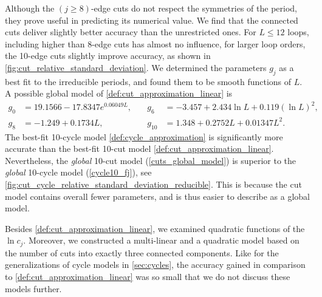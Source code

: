 \documentclass[12pt]{article}
\numberwithin{equation}{section}
\begin{document}
Although the $(j\geq 8)$-edge cuts do not respect the symmetries of the period, they prove useful in predicting its numerical value. We find that the connected cuts deliver slightly better accuracy than the unrestricted ones. For $L \leq 12$ loops,  including higher than $8$-edge cuts has almost no influence, for larger loop orders, the 10-edge cuts slightly improve accuracy, as shown in \cref{fig:cut_relative_standard_deviation}.  
We determined the parameters $g_j$ as a best fit to the irreducible periods, and found them to be smooth functions of $L$. A possible global model of \cref{def:cut_approximation_linear} is
\begin{align}\label{cuts_global_model}
	g_0 &= 19.1566 -17.8347 e^{ 0.06049 L}, \quad &g_6 &= -3.457 + 2.434 \ln L + 0.119 (\ln L)^2, \nonumber\\
	g_8 &= -1.249 + 0.1734 L , \qquad &g_{10} &= 1.348 + 0.2752 L + 0.01347 L^2.
\end{align}
The best-fit 10-cycle model \cref{def:cycle_approximation} is significantly more accurate than the best-fit 10-cut model \cref{def:cut_approximation_linear}. Nevertheless, the \emph{global} 10-cut model (\cref{cuts_global_model}) is superior to the \emph{global} 10-cycle model (\cref{cycle10_fj}), see \cref{fig:cut_cycle_relative_standard_deviation_reducible}. This is because the cut model contains overall fewer parameters, and is thus easier to describe as a global model. 


Besides \cref{def:cut_approximation_linear}, we  examined quadratic functions of the $\ln  c_j $. Moreover, we constructed a multi-linear and a quadratic model based on the number of cuts into exactly three connected components. Like for the generalizations of cycle models in \cref{sec:cycles}, the accuracy gained in comparison to \cref{def:cut_approximation_linear} was so small that we do not discuss these models further. 
\end{document}
